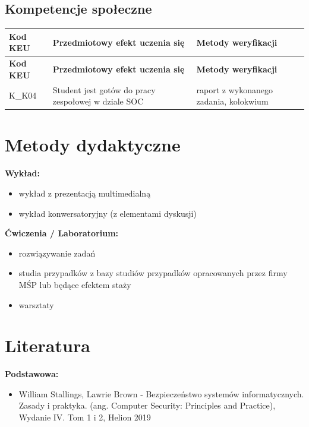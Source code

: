 \documentclass[12pt, a4paper]{article}
\newcommand{\thdrule}{\noalign{\global\setlength{\extrarowheight}{0pt}}}
\newcommand{\thdend}{\noalign{\global\setlength{\extrarowheight}{3pt}}}
\begin{document}
\subsection*{Kompetencje społeczne}
{\scriptsize
\begin{longtable}{m{1.6cm}m{9.0cm}m{4.2cm}}
\thdrule\toprule
\rowcolor{pjatkRed} {\color{white}\footnotesize\textbf{\vphantom{Ag}Kod KEU}} & {\color{white}\footnotesize\textbf{\vphantom{Ag}Przedmiotowy efekt uczenia się}} & {\color{white}\footnotesize\textbf{\vphantom{Ag}Metody weryfikacji}} \\
\midrule\thdend
\endfirsthead
\thdrule\toprule
\rowcolor{pjatkRed} {\color{white}\footnotesize\textbf{\vphantom{Ag}Kod KEU}} & {\color{white}\footnotesize\textbf{\vphantom{Ag}Przedmiotowy efekt uczenia się}} & {\color{white}\footnotesize\textbf{\vphantom{Ag}Metody weryfikacji}} \\
\midrule\thdend
\endhead
  \rowcolor{tableRowLight} K\_K04 & Student jest gotów do pracy zespołowej w dziale SOC & raport z wykonanego zadania, kolokwium \\
\bottomrule
\end{longtable}}

\section{Metody dydaktyczne}

\textbf{Wykład:}
\begin{itemize}
  \item wykład z prezentacją multimedialną
  \item wykład konwersatoryjny (z elementami dyskusji)
\end{itemize}
\vspace{4pt}
\textbf{Ćwiczenia / Laboratorium:}
\begin{itemize}
  \item rozwiązywanie zadań
  \item studia przypadków z bazy studiów przypadków opracowanych przez firmy MŚP lub będące efektem staży
  \item warsztaty
\end{itemize}
\vspace{4pt}


\section{Literatura}

\textbf{Podstawowa:}
\begin{itemize}
  \item William Stallings, Lawrie Brown - Bezpieczeństwo systemów informatycznych. Zasady i praktyka. (ang. Computer Security: Principles and Practice), Wydanie IV. Tom 1 i 2, Helion 2019
\end{itemize}
\end{document}

